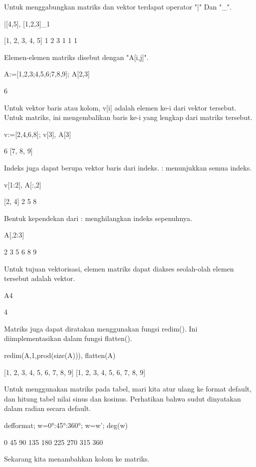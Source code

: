 \documentclass{article}
\begin{document}
Untuk menggabungkan matriks dan vektor terdapat operator "|" Dan "_".


\>[1,2,3]|[4,5], [1,2,3]\_1


    [1,  2,  3,  4,  5]
                1             2             3 
                1             1             1 

Elemen-elemen matriks disebut dengan "A[i,j]".


\>A:=[1,2,3;4,5,6;7,8,9]; A[2,3]


    6

Untuk vektor baris atau kolom, v[i] adalah elemen ke-i dari vektor
tersebut. Untuk matriks, ini mengembalikan baris ke-i yang lengkap
dari matriks tersebut.


\>v:=[2,4,6,8]; v[3], A[3]


    6
    [7,  8,  9]

Indeks juga dapat berupa vektor baris dari indeks. : menunjukkan semua
indeks.


\>v[1:2], A[:,2]


    [2,  4]
                2 
                5 
                8 

Bentuk kependekan dari : menghilangkan indeks sepenuhnya.


\>A[,2:3]


                2             3 
                5             6 
                8             9 

Untuk tujuan vektorisasi, elemen matriks dapat diakses seolah-olah
elemen tersebut adalah vektor.


\>A{4}


    4

Matriks juga dapat diratakan menggunakan fungsi redim(). Ini
diimplementasikan dalam fungsi flatten().


\>redim(A,1,prod(size(A))), flatten(A)


    [1,  2,  3,  4,  5,  6,  7,  8,  9]
    [1,  2,  3,  4,  5,  6,  7,  8,  9]

Untuk menggunakan matriks pada tabel, mari kita atur ulang ke format
default, dan hitung tabel nilai sinus dan kosinus. Perhatikan bahwa
sudut dinyatakan dalam radian secara default.


\>defformat; w=0°:45°:360°; w=w'; deg(w)


                0 
               45 
               90 
              135 
              180 
              225 
              270 
              315 
              360 

Sekarang kita menambahkan kolom ke matriks.
\end{document}

